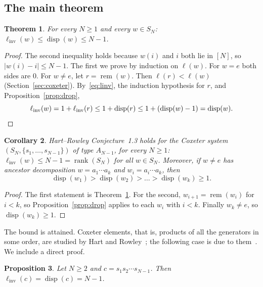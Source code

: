 \documentclass[11pt]{amsart}
\newtheorem{theorem}{Theorem}[section]
\newtheorem{proposition}[theorem]{Proposition}
\newtheorem{corollary}[theorem]{Corollary}
\theoremstyle{definition}
\theoremstyle{remark}
\numberwithin{equation}{section}
\newcommand{\linv}{\ell_{\mathrm{inv}}}
\newcommand{\abs}[1]{\lvert #1\rvert}
\DeclareMathOperator{\rem}{rem}
\DeclareMathOperator{\disp}{disp}
\DeclareMathOperator{\rank}{rank}
\begin{document}
\subsection{The main theorem}

\begin{theorem}\label{thm:A}
For every \(N\ge1\) and every \(w\in S_N\): \(\linv(w)\le\disp(w)\le N-1\).
\end{theorem}

\begin{proof}
The second inequality holds because \(w(i)\) and \(i\) both lie in \([N]\), so \(\abs{w(i)-i}\le N-1\). The first we prove by induction on \(\ell(w)\). For \(w=e\) both sides are \(0\). For \(w\neq e\), let \(r=\rem(w)\). Then \(\ell(r)<\ell(w)\) (Section~\ref{sec:coxeter}). By~\eqref{eq:linv}, the induction hypothesis for \(r\), and Proposition~\ref{prop:drop},
\[
\linv(w)=1+\linv(r)\le1+\disp(r)\le1+(\disp(w)-1)=\disp(w).\qedhere
\]
\end{proof}

\begin{corollary}\label{cor:A}
Hart--Rowley Conjecture~1.3 holds for the Coxeter system \((S_N,\{s_1,\dots,s_{N-1}\})\) of type \(A_{N-1}\), for every \(N\ge1\): \(\linv(w)\le N-1=\rank(S_N)\) for all \(w\in S_N\). Moreover, if \(w\neq e\) has ancestor decomposition \(w=a_1\cdots a_k\) and \(w_i=a_i\cdots a_k\), then
\[
\disp(w_1)>\disp(w_2)>\dots>\disp(w_k)\ge1.
\]
\end{corollary}

\begin{proof}
The first statement is Theorem~\ref{thm:A}. For the second, \(w_{i+1}=\rem(w_i)\) for \(i<k\), so Proposition~\ref{prop:drop} applies to each \(w_i\) with \(i<k\). Finally \(w_k\neq e\), so \(\disp(w_k)\ge1\).
\end{proof}

The bound is attained. Coxeter elements, that is, products of all the generators in some order, are studied by Hart and Rowley~\cite{HR}; the following case is due to them~\cite[Prop.~2.5 and the remarks after it]{HR}. We include a direct proof.

\begin{proposition}\label{prop:attained}
Let \(N\ge2\) and \(c=s_1s_2\cdots s_{N-1}\). Then \(\linv(c)=\disp(c)=N-1\).
\end{proposition}
\end{document}
